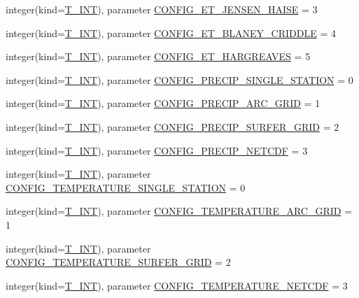 \begin{DoxyCompactItemize}
integer(kind=\hyperlink{namespacetypes_a4e4d040a4425196c4d43be63e7e6103a}{T\_\-INT}), parameter \hyperlink{namespacetypes_a96a773d2a9e9595b49aaee65d3618d28}{CONFIG\_\-ET\_\-JENSEN\_\-HAISE} = 3
\item 
integer(kind=\hyperlink{namespacetypes_a4e4d040a4425196c4d43be63e7e6103a}{T\_\-INT}), parameter \hyperlink{namespacetypes_af0221b3cca59af99efb7f293b9c19cd7}{CONFIG\_\-ET\_\-BLANEY\_\-CRIDDLE} = 4
\item 
integer(kind=\hyperlink{namespacetypes_a4e4d040a4425196c4d43be63e7e6103a}{T\_\-INT}), parameter \hyperlink{namespacetypes_a49692bf2a330b895cc7748e71c099d36}{CONFIG\_\-ET\_\-HARGREAVES} = 5
\item 
integer(kind=\hyperlink{namespacetypes_a4e4d040a4425196c4d43be63e7e6103a}{T\_\-INT}), parameter \hyperlink{namespacetypes_ac2eb7f45340cf35eb5bf1d5929b09f7f}{CONFIG\_\-PRECIP\_\-SINGLE\_\-STATION} = 0
\item 
integer(kind=\hyperlink{namespacetypes_a4e4d040a4425196c4d43be63e7e6103a}{T\_\-INT}), parameter \hyperlink{namespacetypes_afabf941aeacf590c7e1d6aa9aed0cbbd}{CONFIG\_\-PRECIP\_\-ARC\_\-GRID} = 1
\item 
integer(kind=\hyperlink{namespacetypes_a4e4d040a4425196c4d43be63e7e6103a}{T\_\-INT}), parameter \hyperlink{namespacetypes_abcdf72d1f81b2916cf775e1431de6b29}{CONFIG\_\-PRECIP\_\-SURFER\_\-GRID} = 2
\item 
integer(kind=\hyperlink{namespacetypes_a4e4d040a4425196c4d43be63e7e6103a}{T\_\-INT}), parameter \hyperlink{namespacetypes_af0fe53cfc13c9f0ce2c3a80d2732c602}{CONFIG\_\-PRECIP\_\-NETCDF} = 3
\item 
integer(kind=\hyperlink{namespacetypes_a4e4d040a4425196c4d43be63e7e6103a}{T\_\-INT}), parameter \hyperlink{namespacetypes_a821c4b808dde869fec2b125892518a86}{CONFIG\_\-TEMPERATURE\_\-SINGLE\_\-STATION} = 0
\item 
integer(kind=\hyperlink{namespacetypes_a4e4d040a4425196c4d43be63e7e6103a}{T\_\-INT}), parameter \hyperlink{namespacetypes_a6d33c5d4a9049260961a4a2ab73ea6c1}{CONFIG\_\-TEMPERATURE\_\-ARC\_\-GRID} = 1
\item 
integer(kind=\hyperlink{namespacetypes_a4e4d040a4425196c4d43be63e7e6103a}{T\_\-INT}), parameter \hyperlink{namespacetypes_af01dca6362f0a51f0e5091ef26571bc8}{CONFIG\_\-TEMPERATURE\_\-SURFER\_\-GRID} = 2
\item 
integer(kind=\hyperlink{namespacetypes_a4e4d040a4425196c4d43be63e7e6103a}{T\_\-INT}), parameter \hyperlink{namespacetypes_a8c7057d336d6c65e7b528b189e6383ff}{CONFIG\_\-TEMPERATURE\_\-NETCDF} = 3

\end{DoxyCompactItemize}
